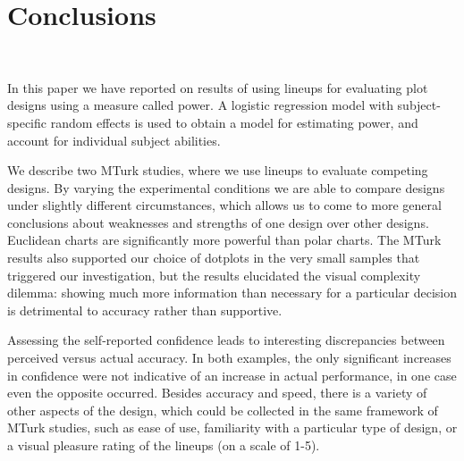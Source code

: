 \section{Conclusions}~\label{conclusions}

In this paper we have reported on results of using lineups for evaluating plot designs using a measure called power.  A logistic regression model with subject-specific random effects is used to obtain a model for estimating power, and account for individual subject abilities. 


We describe two MTurk studies, where we use lineups to  evaluate competing designs. By varying the experimental conditions we are able to compare designs under slightly different circumstances, which allows us to come to more general conclusions about weaknesses and strengths of one design over other designs.  Euclidean charts are significantly more powerful than polar charts. The MTurk results also supported our choice of dotplots in the very small samples that triggered our investigation, but the results elucidated the visual complexity dilemma: showing much more information than necessary for a particular decision is detrimental to accuracy rather than supportive.

Assessing the self-reported confidence leads to interesting discrepancies between perceived versus actual accuracy. In both examples, the only significant increases in confidence were not indicative of an increase in actual performance, in one case even the opposite occurred. Besides accuracy and speed, there is a variety of other aspects of the design, which could be collected in  the same framework of  MTurk studies, such as ease of use, familiarity with a particular type of design, or a visual pleasure rating of the lineups  (on a scale of 1-5).




